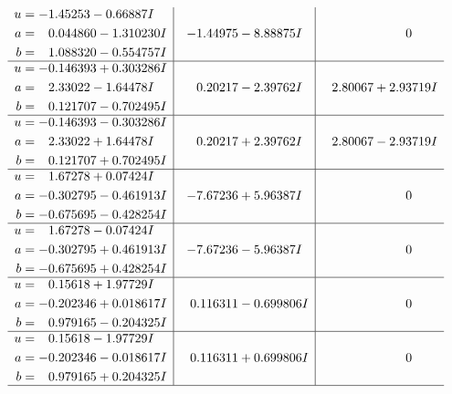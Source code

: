 \documentclass[1p]{elsarticle_modified}
\theoremstyle{definition}
\begin{document}
$$\begin{array}{c|c|c}
\begin{aligned}
u &= -1.45253 - 0.66887 I \\
a &= \phantom{-}0.044860 - 1.310230 I \\
b &= \phantom{-}1.088320 - 0.554757 I\end{aligned}
 & -1.44975 - 8.88875 I & \phantom{-0.000000 } 0 \\ \hline\begin{aligned}
u &= -0.146393 + 0.303286 I \\
a &= \phantom{-}2.33022 - 1.64478 I \\
b &= \phantom{-}0.121707 - 0.702495 I\end{aligned}
 & \phantom{-}0.20217 - 2.39762 I & \phantom{-}2.80067 + 2.93719 I \\ \hline\begin{aligned}
u &= -0.146393 - 0.303286 I \\
a &= \phantom{-}2.33022 + 1.64478 I \\
b &= \phantom{-}0.121707 + 0.702495 I\end{aligned}
 & \phantom{-}0.20217 + 2.39762 I & \phantom{-}2.80067 - 2.93719 I \\ \hline\begin{aligned}
u &= \phantom{-}1.67278 + 0.07424 I \\
a &= -0.302795 - 0.461913 I \\
b &= -0.675695 - 0.428254 I\end{aligned}
 & -7.67236 + 5.96387 I & \phantom{-0.000000 } 0 \\ \hline\begin{aligned}
u &= \phantom{-}1.67278 - 0.07424 I \\
a &= -0.302795 + 0.461913 I \\
b &= -0.675695 + 0.428254 I\end{aligned}
 & -7.67236 - 5.96387 I & \phantom{-0.000000 } 0 \\ \hline\begin{aligned}
u &= \phantom{-}0.15618 + 1.97729 I \\
a &= -0.202346 + 0.018617 I \\
b &= \phantom{-}0.979165 - 0.204325 I\end{aligned}
 & \phantom{-}0.116311 - 0.699806 I & \phantom{-0.000000 } 0 \\ \hline\begin{aligned}
u &= \phantom{-}0.15618 - 1.97729 I \\
a &= -0.202346 - 0.018617 I \\
b &= \phantom{-}0.979165 + 0.204325 I\end{aligned}
 & \phantom{-}0.116311 + 0.699806 I & \phantom{-0.000000 } 0\\
 \hline 
 \end{array}$$\newpage\newpage\renewcommand{\arraystretch}{1}
\end{document}
